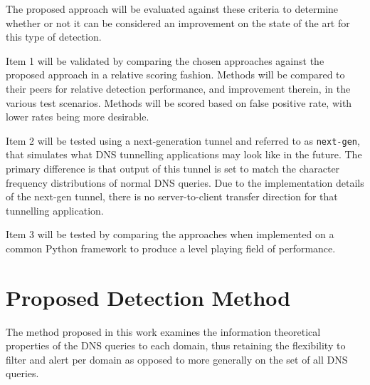 \documentclass{llncs}
\begin{document}
The proposed approach will be evaluated against these criteria to determine
whether or not it can be considered an improvement on the state of the art for
this type of detection. 


Item 1 will be validated by comparing the chosen approaches against the proposed
approach in a relative scoring fashion. Methods will be compared to their peers
for relative detection performance, and improvement therein, in the various test
scenarios. Methods will be scored based on false positive rate, with lower rates
being more desirable.

Item 2 will be tested using a next-generation tunnel and referred to as
\texttt{next-gen}, that simulates what DNS tunnelling applications may look like
in the future. The primary difference is that output of this tunnel is set to
match the character frequency distributions of normal DNS queries. Due to the
implementation details of the next-gen tunnel, there is no server-to-client
transfer direction for that tunnelling application.

Item 3 will be tested by comparing the approaches when implemented on a common
Python framework to produce a level playing field of performance.

\section{Proposed Detection Method}
\label{proposed-method}

The method proposed in this work examines the information theoretical properties
of the DNS queries to each domain, thus retaining the flexibility to filter
and alert per domain as opposed to more generally on the set of all DNS queries.
\end{document}
